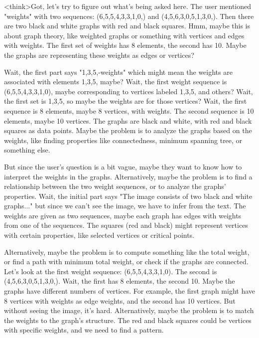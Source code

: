<think>Got, let's try to figure out what's being asked here. The user mentioned "weights" with two sequences: (6,5,5,4,3,3,1,0,) and (4,5,6,3,0,5,1,3,0,). Then there are two black and white graphs with red and black squares. Hmm, maybe this is about graph theory, like weighted graphs or something with vertices and edges with weights. The first set of weights has 8 elements, the second has 10. Maybe the graphs are representing these weights as edges or vertices?

Wait, the first part says "{1,3,5,}-weights" which might mean the weights are associated with elements 1,3,5, maybe? Wait, the first weight sequence is (6,5,5,4,3,3,1,0), maybe corresponding to vertices labeled 1,3,5, and others? Wait, the first set is {1,3,5}, so maybe the weights are for those vertices? Wait, the first sequence is 8 elements, maybe 8 vertices, with weights. The second sequence is 10 elements, maybe 10 vertices. The graphs are black and white, with red and black squares as data points. Maybe the problem is to analyze the graphs based on the weights, like finding properties like connectedness, minimum spanning tree, or something else.

But since the user's question is a bit vague, maybe they want to know how to interpret the weights in the graphs. Alternatively, maybe the problem is to find a relationship between the two weight sequences, or to analyze the graphs' properties. Wait, the initial part says "The image consists of two black and white graphs..." but since we can't see the image, we have to infer from the text. The weights are given as two sequences, maybe each graph has edges with weights from one of the sequences. The squares (red and black) might represent vertices with certain properties, like selected vertices or critical points.

Alternatively, maybe the problem is to compute something like the total weight, or find a path with minimum total weight, or check if the graphs are connected. Let's look at the first weight sequence: (6,5,5,4,3,3,1,0). The second is (4,5,6,3,0,5,1,3,0,). Wait, the first has 8 elements, the second 10. Maybe the graphs have different numbers of vertices. For example, the first graph might have 8 vertices with weights as edge weights, and the second has 10 vertices. But without seeing the image, it's hard. Alternatively, maybe the problem is to match the weights to the graph's structure. The red and black squares could be vertices with specific weights, and we need to find a pattern.

